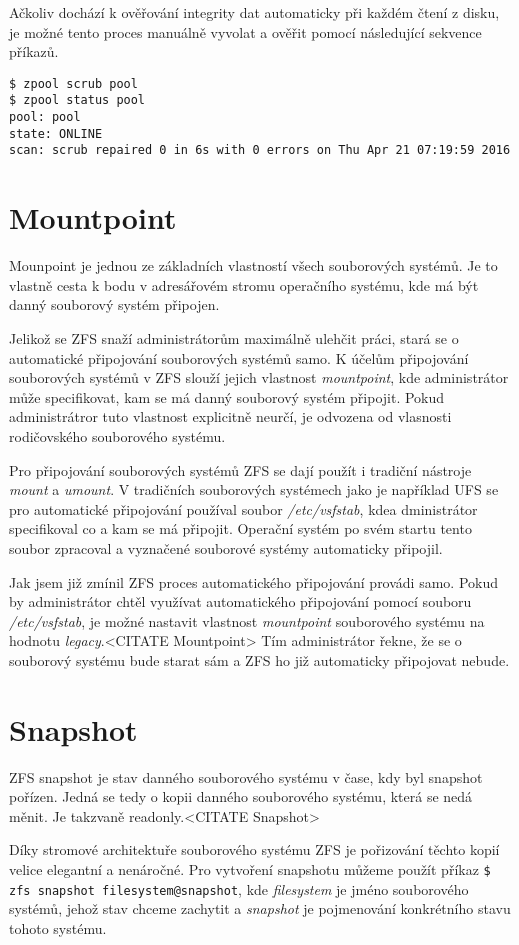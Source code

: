 Ačkoliv dochází k ověřování integrity dat automaticky při každém čtení z disku, je možné tento proces manuálně vyvolat a ověřit pomocí následující sekvence příkazů.
\begin{verbatim}
$ zpool scrub pool
$ zpool status pool
pool: pool
state: ONLINE
scan: scrub repaired 0 in 6s with 0 errors on Thu Apr 21 07:19:59 2016
\end{verbatim}

\section{Mountpoint}
\label{mountpoint}
Mounpoint je jednou ze základních vlastností všech souborových systémů. Je to vlastně cesta k bodu v adresářovém stromu operačního systému, kde má být danný souborový systém připojen.

Jelikož se ZFS snaží administrátorům maximálně ulehčit práci, stará se o automatické připojování souborových systémů samo. K účelům připojování souborových systémů v ZFS slouží jejich vlastnost \emph{mountpoint}, kde administrátor může specifikovat, kam se má danný souborový systém připojit. Pokud administrátror tuto vlastnost explicitně neurčí, je odvozena od vlasnosti rodičovského souborového systému.

Pro připojování souborových systémů ZFS se dají použít i tradiční nástroje \emph{mount} a \emph{umount}. V tradičních souborových systémech jako je například UFS se pro automatické připojování používal soubor \emph{/etc/vsfstab}, kdea dministrátor specifikoval co a kam se má připojit. Operační systém po svém startu tento soubor zpracoval a vyznačené souborové systémy automaticky připojil.

Jak jsem již zmínil ZFS proces automatického připojování provádi samo. Pokud by administrátor chtěl využívat automatického připojování pomocí souboru \emph{/etc/vsfstab}, je možné nastavit vlastnost \emph{mountpoint} souborového systému na hodnotu \emph{legacy}.<CITATE Mountpoint> Tím administrátor řekne, že se o souborový systému bude starat sám a ZFS ho již automaticky připojovat nebude.
\section{Snapshot}
\label{snapshot}
ZFS snapshot je stav danného souborového systému v čase, kdy byl snapshot pořízen. Jedná se tedy o kopii danného souborového systému, která se nedá měnit. Je takzvaně readonly.<CITATE Snapshot>

Díky stromové architektuře souborového systému ZFS je pořizování těchto kopií velice elegantní a nenáročné. Pro vytvoření snapshotu můžeme použít příkaz \verb|$ zfs snapshot filesystem@snapshot|, kde \emph{filesystem} je jméno souborového systémů, jehož stav chceme zachytit a \emph{snapshot} je pojmenování konkrétního stavu tohoto systému.


